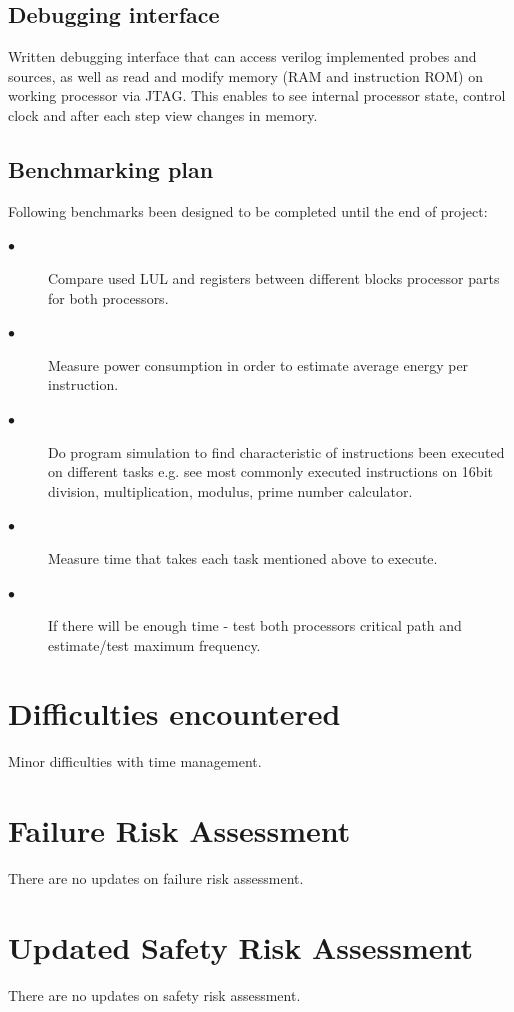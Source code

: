 \documentclass[a4paper,12pt]{article}
\begin{document}
\subsection{Debugging interface}
Written debugging interface that can access verilog implemented probes and sources, as well as read and modify memory (RAM and instruction ROM) on working processor via JTAG. This enables to see internal processor state, control clock and after each step view changes in memory.

\subsection{Benchmarking plan}
Following benchmarks been designed to be completed until the end of project:
\begin{description}
	\item[$\bullet$] Compare used LUL and registers between different blocks processor parts for both processors.
	\item[$\bullet$] Measure power consumption in order to estimate average energy per instruction.
	\item[$\bullet$] Do program simulation to find characteristic of instructions been executed on different tasks e.g. see most commonly executed instructions on 16bit division, multiplication, 
	modulus, prime number calculator.	
	\item[$\bullet$] Measure time that takes each task mentioned above to execute.
	\item[$\bullet$] If there will be enough time - test both processors critical path and estimate/test maximum frequency.
\end{description}



\section{Difficulties encountered}
Minor difficulties with time management.

\section{Failure Risk Assessment}
There are no updates on failure risk assessment. 

\section{Updated Safety Risk Assessment}
There are no updates on safety risk assessment.
\end{document}
